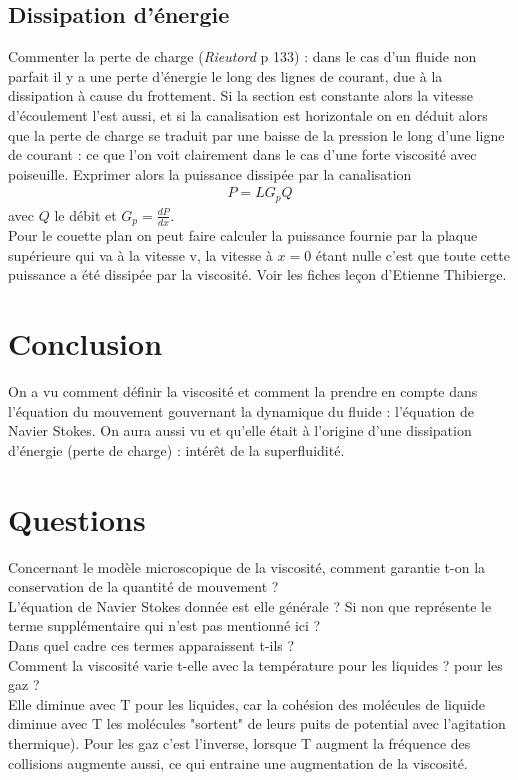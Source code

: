 \documentclass[12pt,prb,aps,epsf]{article}
\begin{document}
\subsection{Dissipation d'énergie}
Commenter la perte de charge (\textit{Rieutord} p 133) : dans le cas d'un fluide non parfait il y a une perte d'énergie le long des lignes de courant, due à la dissipation à cause du frottement. Si la section est constante alors la vitesse d'écoulement l'est aussi, et si la canalisation est horizontale on en déduit alors que la perte de charge se traduit par une baisse de la pression le long d'une ligne de courant : ce que l'on voit clairement dans le cas d'une forte viscosité avec poiseuille. Exprimer alors la puissance dissipée par la canalisation
\begin{eqnarray}
P = L G_p Q
\end{eqnarray}
avec $Q$ le débit et $G_p = \frac{dP}{dx}$.\\

Pour le couette plan on peut faire calculer la puissance fournie par la plaque supérieure qui va à la vitesse v, la vitesse à $x=0$ étant nulle c'est que toute cette puissance a été dissipée par la viscosité. Voir les fiches leçon d'Etienne Thibierge.

\section*{Conclusion}
On a vu comment définir la viscosité et comment la prendre en compte dans l'équation du mouvement gouvernant la dynamique du fluide : l'équation de Navier Stokes. On aura aussi vu et qu'elle était à l'origine d'une dissipation d'énergie (perte de charge) : intérêt de la superfluidité.

\pagebreak

\section*{Questions}
Concernant le modèle microscopique de la viscosité, comment garantie t-on la conservation de la quantité de mouvement ?\\

L'équation de Navier Stokes donnée est elle générale ? Si non que représente le terme supplémentaire qui n'est pas mentionné ici ?\\

Dans quel cadre ces termes apparaissent t-ils ?\\

Comment la viscosité varie t-elle avec la température pour les liquides ? pour les gaz ?\\
Elle diminue avec T pour les liquides, car la cohésion des molécules de liquide diminue avec T  les molécules "sortent" de leurs puits de potential avec l'agitation thermique). Pour les gaz c'est l'inverse, lorsque T augment la fréquence des collisions augmente aussi, ce qui entraine une augmentation de la viscosité.\\
\end{document}
